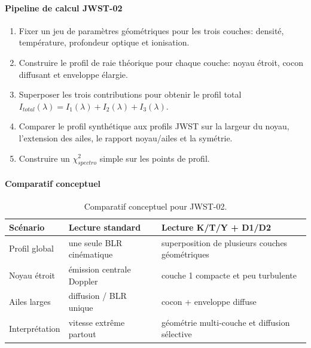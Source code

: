\documentclass[11pt,a4paper]{article}
\begin{document}
\paragraph{Pipeline de calcul JWST-02}
\begin{enumerate}
	\item Fixer un jeu de paramètres géométriques pour les trois couches: densité, température, profondeur optique et ionisation.
	\item Construire le profil de raie théorique pour chaque couche: noyau étroit, cocon diffusant et enveloppe élargie.
	\item Superposer les trois contributions pour obtenir le profil total $I_{total}(\lambda)=I_1(\lambda)+I_2(\lambda)+I_3(\lambda)$.
	\item Comparer le profil synthétique aux profils JWST sur la largeur du noyau, l'extension des ailes, le rapport noyau/ailes et la symétrie.
	\item Construire un $\chi^2_{spectro}$ simple sur les points de profil.
\end{enumerate}

\paragraph{Comparatif conceptuel}
\begin{table}[htbp]
\centering
\begin{tabular}{>{\raggedright\arraybackslash}p{4cm} >{\raggedright\arraybackslash}p{5.2cm} >{\raggedright\arraybackslash}p{5.2cm}}
\toprule
Scénario & Lecture standard & Lecture K/T/Y + D1/D2 \\
\midrule
Profil global & une seule BLR cinématique & superposition de plusieurs couches géométriques \\
Noyau étroit & émission centrale Doppler & couche 1 compacte et peu turbulente \\
Ailes larges & diffusion / BLR unique & cocon + enveloppe diffuse \\
Interprétation & vitesse extrême partout & géométrie multi-couche et diffusion sélective \\
\bottomrule
\end{tabular}
\caption{Comparatif conceptuel pour JWST-02.}
\end{table}

\FloatBarrier
\end{document}
